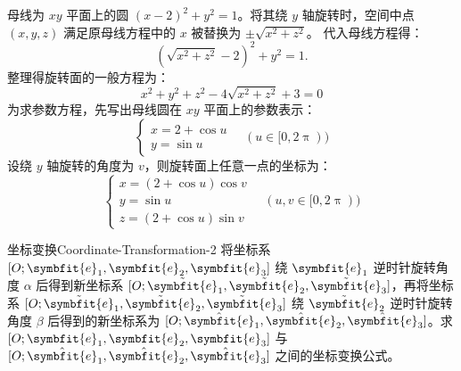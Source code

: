 \begin{solution}
    母线为 $xy$ 平面上的圆 $(x - 2)^2 + y^2 = 1$。将其绕 $y$ 轴旋转时，空间中点 $(x, y, z)$ 满足原母线方程中的 $x$ 被替换为 $\pm \sqrt{x^2 + z^2}$。
    代入母线方程得：
    \begin{equation}
        (\sqrt{x^2 + z^2} - 2)^2 + y^2 = 1.
    \end{equation}
    整理得旋转面的一般方程为：
    \begin{equation}
        \boxed{x^2 + y^2 + z^2 - 4\sqrt{x^2 + z^2} + 3 = 0}
    \end{equation}
    为求参数方程，先写出母线圆在 $xy$ 平面上的参数表示：
    \begin{equation}
        \begin{cases}
            x = 2 + \cos u \\
            y = \sin u
        \end{cases} \quad (u \in [0, 2\uppi))
    \end{equation}
    设绕 $y$ 轴旋转的角度为 $v$，则旋转面上任意一点的坐标为：
    \begin{equation}
        \boxed{\begin{cases}
            x = (2 + \cos u) \cos v \\
            y = \sin u              \\
            z = (2 + \cos u) \sin v
        \end{cases} \quad (u, v \in [0, 2\uppi))}
    \end{equation}
\end{solution}


\begin{problem}{坐标变换}{Coordinate-Transformation-2}
    将坐标系 $[O; \symbfit{e}_1, \symbfit{e}_2, \symbfit{e}_3]$ 绕 $\symbfit{e}_1$ 逆时针旋转角度 $\alpha$ 后得到新坐标系 $[O; \tilde{\symbfit{e}}_1, \tilde{\symbfit{e}}_2, \tilde{\symbfit{e}}_3]$，再将坐标系 $[O; \tilde{\symbfit{e}}_1, \tilde{\symbfit{e}}_2, \tilde{\symbfit{e}}_3]$ 绕 $\tilde{\symbfit{e}}_2$ 逆时针旋转角度 $\beta$ 后得到的新坐标系为 $[O; \hat{\symbfit{e}}_1, \hat{\symbfit{e}}_2, \hat{\symbfit{e}}_3]$。求 $[O; \symbfit{e}_1, \symbfit{e}_2, \symbfit{e}_3]$ 与 $[O; \hat{\symbfit{e}}_1, \hat{\symbfit{e}}_2, \hat{\symbfit{e}}_3]$ 之间的坐标变换公式。
\end{problem}

